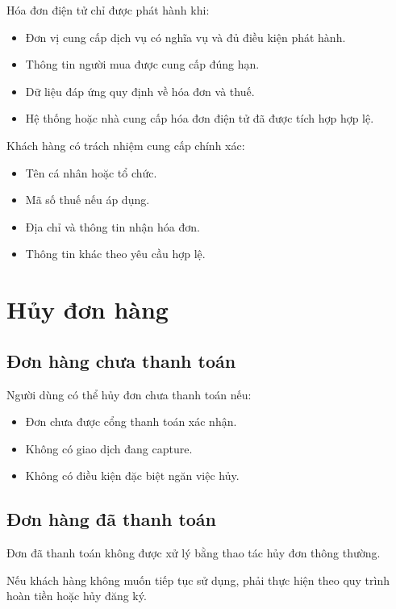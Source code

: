 \documentclass[12pt,a4paper]{article}
\begin{document}
Hóa đơn điện tử chỉ được phát hành khi:

\begin{itemize}
    \item Đơn vị cung cấp dịch vụ có nghĩa vụ và đủ điều kiện phát hành.
    \item Thông tin người mua được cung cấp đúng hạn.
    \item Dữ liệu đáp ứng quy định về hóa đơn và thuế.
    \item Hệ thống hoặc nhà cung cấp hóa đơn điện tử đã được tích hợp hợp lệ.
\end{itemize}

Khách hàng có trách nhiệm cung cấp chính xác:

\begin{itemize}
    \item Tên cá nhân hoặc tổ chức.
    \item Mã số thuế nếu áp dụng.
    \item Địa chỉ và thông tin nhận hóa đơn.
    \item Thông tin khác theo yêu cầu hợp lệ.
\end{itemize}

\section{Hủy đơn hàng}

\subsection{Đơn hàng chưa thanh toán}

Người dùng có thể hủy đơn chưa thanh toán nếu:

\begin{itemize}
    \item Đơn chưa được cổng thanh toán xác nhận.
    \item Không có giao dịch đang capture.
    \item Không có điều kiện đặc biệt ngăn việc hủy.
\end{itemize}

\subsection{Đơn hàng đã thanh toán}

Đơn đã thanh toán không được xử lý bằng thao tác hủy đơn thông thường.

Nếu khách hàng không muốn tiếp tục sử dụng,
phải thực hiện theo quy trình hoàn tiền hoặc hủy đăng ký.
\end{document}
